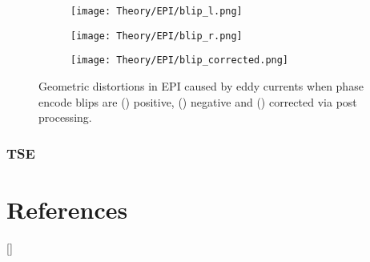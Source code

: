 \begin{figure}[H]
	\centering
	\begin{subfigure}[c]{0.30\textwidth}
		\centering
		\texttt{[image: Theory/EPI/blip\_l.png]}
		\caption{}
		\label{fig:theory_epi_blip_l}
	\end{subfigure}
	\hfill
	\begin{subfigure}[c]{0.30\textwidth}
		\centering
		\texttt{[image: Theory/EPI/blip\_r.png]}
		\caption{}
		\label{fig:theory_epi_blip_r}
	\end{subfigure}
	\hfill	
	\begin{subfigure}[c]{0.30\textwidth}
		\centering
		\texttt{[image: Theory/EPI/blip\_corrected.png]}
		\caption{}
		\label{fig:theory_epi_blip_corrected}
	\end{subfigure}
	\caption{Geometric distortions in \ac{EPI} caused by eddy currents when phase encode blips are () positive, () negative and () corrected via post processing.}
	\label{fig:theory_epi_eddy}
\end{figure}


\subsubsection{\ac*{TSE}}

\newpage
\section{References}
[\refname]{}
\printbibliography